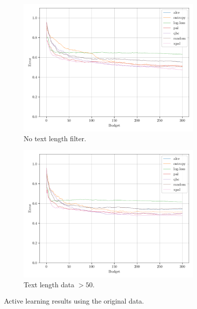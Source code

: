 \begin{figure}[ht]
    \centering
    \begin{subfigure}{0.49\textwidth}
        \includegraphics[width=\textwidth]{../img/plot_text_data_original_proper_vectorizer_test_results}
        \caption{No text length filter.}
        \label{fig:probal_original_proper_vect}
    \end{subfigure}
    \hfill
    \begin{subfigure}{0.49\textwidth}
        \includegraphics[width=\textwidth]{../img/plot_text_data_original_proper_vectorizer_50_st_filter_test_results}
        \caption{Text length data $>50$.}
        \label{fig:probal_original_proper_vect_50_st_filter}
    \end{subfigure}
    \caption{Active learning results using the original data.}
\end{figure}

